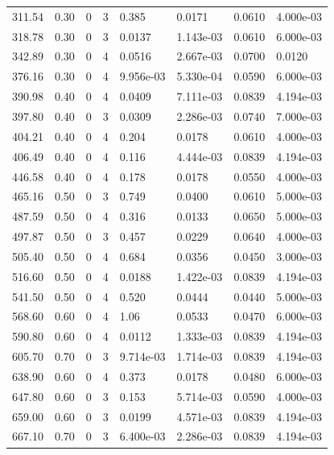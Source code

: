 \documentclass[preview]{standalone}
\begin{document}
{{\begin{tabular}{L{1.2cm}C{1.2cm} C{0.3cm}C{0.5cm} C{1.4cm}C{1.4cm} C{1.4cm}C{1.4cm}}
  311.54  &  0.30  & 0     &  3 &  0.385  & 0.0171  & 0.0610 &  4.000e-03   \\ 
  318.78  &  0.30  & 0     &  3 &  0.0137  & 1.143e-03  & 0.0610 &  6.000e-03   \\ 
  342.89  &  0.30  & 0     &  4 &  0.0516  & 2.667e-03  & 0.0700 &  0.0120   \\ 
  376.16  &  0.30  & 0     &  4 &  9.956e-03  & 5.330e-04  & 0.0590 &  6.000e-03   \\ 
  390.98  &  0.40  & 0     &  4 &  0.0409  & 7.111e-03  & 0.0839 &  4.194e-03   \\ 
  397.80  &  0.40  & 0     &  3 &  0.0309  & 2.286e-03  & 0.0740 &  7.000e-03   \\ 
  404.21  &  0.40  & 0     &  4 &  0.204  & 0.0178  & 0.0610 &  4.000e-03   \\ 
  406.49  &  0.40  & 0     &  4 &  0.116  & 4.444e-03  & 0.0839 &  4.194e-03   \\ 
  446.58  &  0.40  & 0     &  4 &  0.178  & 0.0178  & 0.0550 &  4.000e-03   \\ 
  465.16  &  0.50  & 0     &  3 &  0.749  & 0.0400  & 0.0610 &  5.000e-03   \\ 
  487.59  &  0.50  & 0     &  4 &  0.316  & 0.0133  & 0.0650 &  5.000e-03   \\ 
  497.87  &  0.50  & 0     &  3 &  0.457  & 0.0229  & 0.0640 &  4.000e-03   \\ 
  505.40  &  0.50  & 0     &  4 &  0.684  & 0.0356  & 0.0450 &  3.000e-03   \\ 
  516.60  &  0.50  & 0     &  4 &  0.0188  & 1.422e-03  & 0.0839 &  4.194e-03   \\ 
  541.50  &  0.50  & 0     &  4 &  0.520  & 0.0444  & 0.0440 &  5.000e-03   \\ 
  568.60  &  0.60  & 0     &  4 &  1.06  & 0.0533  & 0.0470 &  6.000e-03   \\ 
  590.80  &  0.60  & 0     &  4 &  0.0112  & 1.333e-03  & 0.0839 &  4.194e-03   \\ 
  605.70  &  0.70  & 0     &  3 &  9.714e-03  & 1.714e-03  & 0.0839 &  4.194e-03   \\ 
  638.90  &  0.60  & 0     &  4 &  0.373  & 0.0178  & 0.0480 &  6.000e-03   \\ 
  647.80  &  0.60  & 0     &  3 &  0.153  & 5.714e-03  & 0.0590 &  4.000e-03   \\ 
  659.00  &  0.60  & 0     &  3 &  0.0199  & 4.571e-03  & 0.0839 &  4.194e-03   \\ 
  667.10  &  0.70  & 0     &  3 &  6.400e-03  & 2.286e-03  & 0.0839 &  4.194e-03   \\ 

\end{tabular}}}
\end{document}
